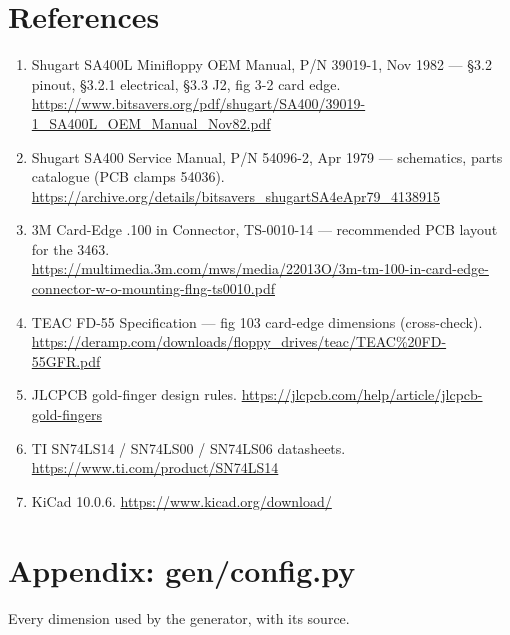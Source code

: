 \documentclass[11pt,a4paper]{article}
\begin{document}
\section{References}
\begin{enumerate}[leftmargin=8mm]
\item Shugart SA400L Minifloppy OEM Manual, P/N 39019-1, Nov 1982 --- \S3.2 pinout, \S3.2.1 electrical,
\S3.3 J2, fig 3-2 card edge.\\ \url{https://www.bitsavers.org/pdf/shugart/SA400/39019-1_SA400L_OEM_Manual_Nov82.pdf}
\item Shugart SA400 Service Manual, P/N 54096-2, Apr 1979 --- schematics, parts catalogue (PCB clamps 54036).\\
\url{https://archive.org/details/bitsavers_shugartSA4eApr79_4138915}
\item 3M Card-Edge .100 in Connector, TS-0010-14 --- recommended PCB layout for the 3463.\\
\url{https://multimedia.3m.com/mws/media/22013O/3m-tm-100-in-card-edge-connector-w-o-mounting-flng-ts0010.pdf}
\item TEAC FD-55 Specification --- fig 103 card-edge dimensions (cross-check).\\
\url{https://deramp.com/downloads/floppy_drives/teac/TEAC\%20FD-55GFR.pdf}
\item JLCPCB gold-finger design rules. \url{https://jlcpcb.com/help/article/jlcpcb-gold-fingers}
\item TI SN74LS14 / SN74LS00 / SN74LS06 datasheets. \url{https://www.ti.com/product/SN74LS14}
\item KiCad 10.0.6. \url{https://www.kicad.org/download/}
\end{enumerate}

\clearpage
\appendix
\section{Appendix: gen/config.py}
Every dimension used by the generator, with its source.

\end{document}
